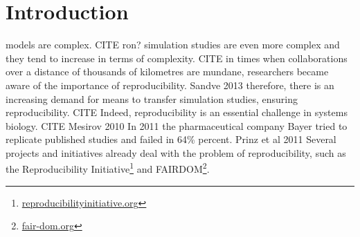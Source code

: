 
\section{Introduction}

models are complex. CITE ron?
simulation studies are even more complex and they tend to increase in terms of complexity. CITE
in times when collaborations over a distance of thousands of kilometres are mundane, researchers became aware of the importance of reproducibility. Sandve 2013
therefore, there is an increasing demand for means to transfer simulation studies, ensuring reproducibility. CITE
Indeed, reproducibility is an essential challenge in systems biology. CITE Mesirov 2010
In 2011 the pharmaceutical company Bayer tried to replicate published studies and failed in 64\% percent. Prinz et al 2011
Several projects and initiatives already deal with the problem of reproducibility, such as the Reproducibility Initiative\footnote{\href{http://reproducibilityinitiative.org/}{reproducibilityinitiative.org}} and FAIRDOM\footnote{\href{http://fair-dom.org/}{fair-dom.org}}.


% 

